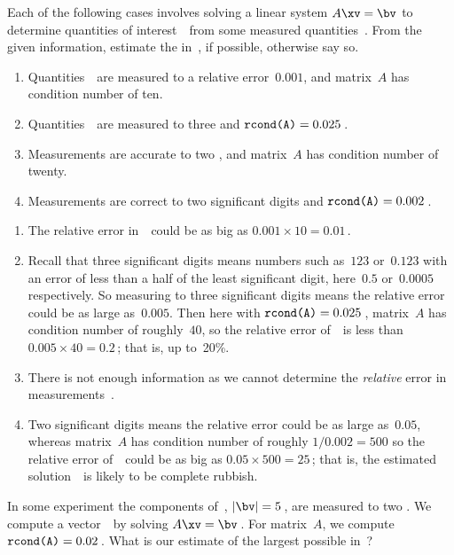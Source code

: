 \begin{example} 
Each of the following cases involves solving a linear system \(A\xv=\bv\) to determine quantities of interest~\xv\ from some measured quantities~\bv.
From the given information, estimate the   in~\xv,  if  possible, otherwise say so.
\begin{enumerate}
\item Quantities~\bv\ are measured to a relative error~\(0.001\), and matrix~\(A\) has condition number of ten.
\item Quantities~\bv\ are measured to three  and \(\verb|rcond(A)|=0.025\)\,.
\item Measurements are accurate to two , and matrix~\(A\) has condition number of twenty.
\item  Measurements are correct to two significant digits and \(\verb|rcond(A)|=0.002\)\,.
\end{enumerate}

\begin{solution} 
\begin{enumerate}
\item The relative error in~\xv\ could be as big as \(0.001\times10=0.01\)\,.
\item Recall that three significant digits means numbers such as~\(123\) or~\(0.123\) with an error of less than a half of the least significant digit, here~\(0.5\) or~\(0.0005\) respectively.
So measuring to three significant digits means the relative error could be as large as~\(0.005\).
Then here with \(\verb|rcond(A)|=0.025\)\,, matrix~\(A\) has condition number of roughly~\(40\), so the relative error of~\xv\ is less than \(0.005\times40=0.2\)\,; that is, up to~20\%.
\item There is not enough information as we cannot determine the \emph{relative} error in measurements~\bv.
\item Two significant digits means the relative error could be as large as~\(0.05\), whereas matrix~\(A\) has condition number of roughly \(1/0.002=500\) so the relative error of~\xv\ could be as big as \(0.05\times500=25\)\,; that is, the estimated solution~\xv\ is likely to be complete rubbish.
\end{enumerate}
\end{solution}
\end{example}




\begin{activity}
In some experiment the components of~\bv, \(|\bv|=5\)\,, are measured to two .
We compute a vector~\xv\ by solving \(A\xv=\bv\)\,. 
For matrix~\(A\), we compute \(\verb|rcond(A)|=0.02\)\,.
What is our estimate of the largest possible  in~\xv?
\end{activity}




